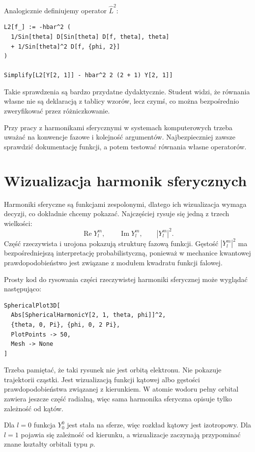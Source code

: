 Analogicznie definiujemy operator \(\hat{L}^2\):
\begin{verbatim}
L2[f_] := -hbar^2 (
  1/Sin[theta] D[Sin[theta] D[f, theta], theta]
  + 1/Sin[theta]^2 D[f, {phi, 2}]
)

Simplify[L2[Y[2, 1]] - hbar^2 2 (2 + 1) Y[2, 1]]
\end{verbatim}

Takie sprawdzenia są bardzo przydatne dydaktycznie. Student widzi, że równania własne nie są deklaracją z tablicy wzorów, lecz czymś, co można bezpośrednio zweryfikować przez różniczkowanie.

\begin{remarkbox}
Przy pracy z harmonikami sferycznymi w systemach komputerowych trzeba uważać na konwencje fazowe i kolejność argumentów. Najbezpieczniej zawsze sprawdzić dokumentację funkcji, a potem testować równania własne operatorów.
\end{remarkbox}

\section{Wizualizacja harmonik sferycznych}

Harmoniki sferyczne są funkcjami zespolonymi, dlatego ich wizualizacja wymaga decyzji, co dokładnie chcemy pokazać. Najczęściej rysuje się jedną z trzech wielkości:
\[
    \operatorname{Re}Y_l^m,
    \qquad
    \operatorname{Im}Y_l^m,
    \qquad
    |Y_l^m|^2.
\]
Część rzeczywista i urojona pokazują strukturę fazową funkcji. Gęstość \(|Y_l^m|^2\) ma bezpośredniejszą interpretację probabilistyczną, ponieważ w mechanice kwantowej prawdopodobieństwo jest związane z modułem kwadratu funkcji falowej.

Prosty kod do rysowania części rzeczywistej harmoniki sferycznej może wyglądać następująco:
\begin{verbatim}
SphericalPlot3D[
  Abs[SphericalHarmonicY[2, 1, theta, phi]]^2,
  {theta, 0, Pi}, {phi, 0, 2 Pi},
  PlotPoints -> 50,
  Mesh -> None
]
\end{verbatim}

Trzeba pamiętać, że taki rysunek nie jest orbitą elektronu. Nie pokazuje trajektorii cząstki. Jest wizualizacją funkcji kątowej albo gęstości prawdopodobieństwa związanej z kierunkiem. W atomie wodoru pełny orbital zawiera jeszcze część radialną, więc sama harmonika sferyczna opisuje tylko zależność od kątów.

\begin{examplebox}
Dla \(l=0\) funkcja \(Y_0^0\) jest stała na sferze, więc rozkład kątowy jest izotropowy. Dla \(l=1\) pojawia się zależność od kierunku, a wizualizacje zaczynają przypominać znane kształty orbitali typu \(p\).
\end{examplebox}

